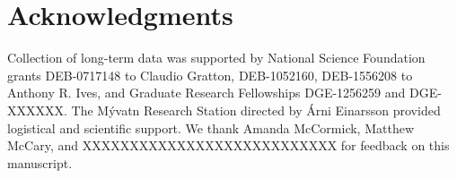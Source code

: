 \documentclass[12pt]{article}
\begin{document}
























\section*{Acknowledgments}

Collection of long-term data was supported by National Science Foundation grants
DEB-0717148 to Claudio Gratton, DEB-1052160, DEB-1556208 to Anthony R. Ives,
and Graduate Research Fellowships DGE-1256259 and DGE-XXXXXX.
The M\'{y}vatn Research Station directed by \'{A}rni Einarsson
provided logistical and scientific support.
We thank Amanda McCormick, Matthew McCary, and XXXXXXXXXXXXXXXXXXXXXXXXXXX 
for feedback on this manuscript.
\end{document}
